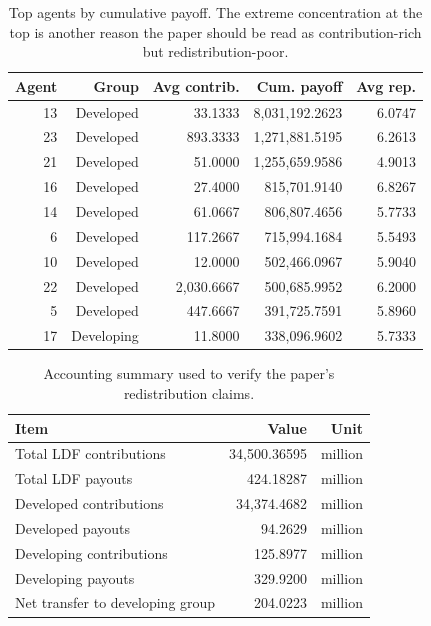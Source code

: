 \documentclass[12pt,letterpaper]{article}
\begin{document}
\begin{table}[H]
\centering
\small
\begin{tabular}{rrrrr}
\toprule
Agent & Group & Avg contrib. & Cum. payoff & Avg rep. \\
\midrule
13 & Developed & 33.1333 & 8,031,192.2623 & 6.0747 \\
23 & Developed & 893.3333 & 1,271,881.5195 & 6.2613 \\
21 & Developed & 51.0000 & 1,255,659.9586 & 4.9013 \\
16 & Developed & 27.4000 & 815,701.9140 & 6.8267 \\
14 & Developed & 61.0667 & 806,807.4656 & 5.7733 \\
6  & Developed & 117.2667 & 715,994.1684 & 5.5493 \\
10 & Developed & 12.0000 & 502,466.0967 & 5.9040 \\
22 & Developed & 2,030.6667 & 500,685.9952 & 6.2000 \\
5  & Developed & 447.6667 & 391,725.7591 & 5.8960 \\
17 & Developing & 11.8000 & 338,096.9602 & 5.7333 \\
\bottomrule
\end{tabular}
\caption{Top agents by cumulative payoff. The extreme concentration at the top is another reason the paper should be read as contribution-rich but redistribution-poor.}
\label{tab:top_agents}
\end{table}

\begin{table}[H]
\centering
\small
\begin{tabular}{lrr}
\toprule
Item & Value & Unit \\
\midrule
Total LDF contributions & 34,500.36595 & million \\
Total LDF payouts & 424.18287 & million \\
Developed contributions & 34,374.4682 & million \\
Developed payouts & 94.2629 & million \\
Developing contributions & 125.8977 & million \\
Developing payouts & 329.9200 & million \\
Net transfer to developing group & 204.0223 & million \\
\bottomrule
\end{tabular}
\caption{Accounting summary used to verify the paper's redistribution claims.}
\label{tab:ldf_accounting}
\end{table}
\end{document}
